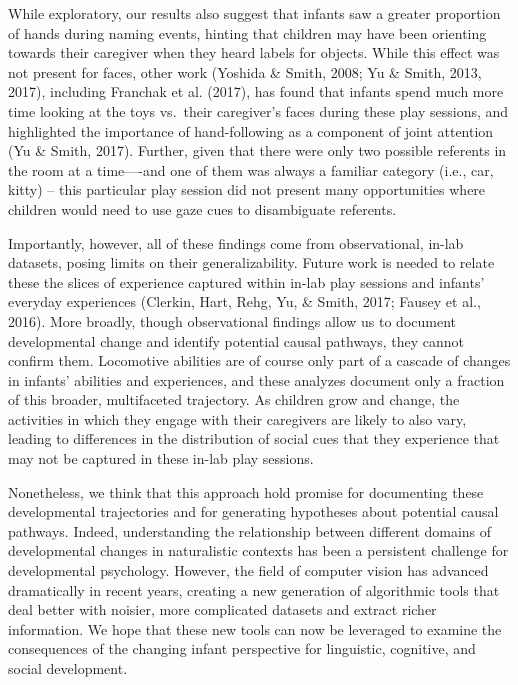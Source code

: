 \documentclass[english,man]{apa6}
\begin{document}
While exploratory, our results also suggest that infants saw a greater
proportion of hands during naming events, hinting that children may have
been orienting towards their caregiver when they heard labels for
objects. While this effect was not present for faces, other work
(Yoshida \& Smith, 2008; Yu \& Smith, 2013, 2017), including Franchak et
al. (2017), has found that infants spend much more time looking at the
toys vs.~their caregiver's faces during these play sessions, and
highlighted the importance of hand-following as a component of joint
attention (Yu \& Smith, 2017). Further, given that there were only two
possible referents in the room at a time----and one of them was always a
familiar category (i.e., car, kitty) -- this particular play session did
not present many opportunities where children would need to use gaze
cues to disambiguate referents.

Importantly, however, all of these findings come from observational,
in-lab datasets, posing limits on their generalizability. Future work is
needed to relate these the slices of experience captured within in-lab
play sessions and infants' everyday experiences (Clerkin, Hart, Rehg,
Yu, \& Smith, 2017; Fausey et al., 2016). More broadly, though
observational findings allow us to document developmental change and
identify potential causal pathways, they cannot confirm them. Locomotive
abilities are of course only part of a cascade of changes in infants'
abilities and experiences, and these analyzes document only a fraction
of this broader, multifaceted trajectory. As children grow and change,
the activities in which they engage with their caregivers are likely to
also vary, leading to differences in the distribution of social cues
that they experience that may not be captured in these in-lab play
sessions.

Nonetheless, we think that this approach hold promise for documenting
these developmental trajectories and for generating hypotheses about
potential causal pathways. Indeed, understanding the relationship
between different domains of developmental changes in naturalistic
contexts has been a persistent challenge for developmental psychology.
However, the field of computer vision has advanced dramatically in
recent years, creating a new generation of algorithmic tools that deal
better with noisier, more complicated datasets and extract richer
information. We hope that these new tools can now be leveraged to
examine the consequences of the changing infant perspective for
linguistic, cognitive, and social development.
\end{document}
